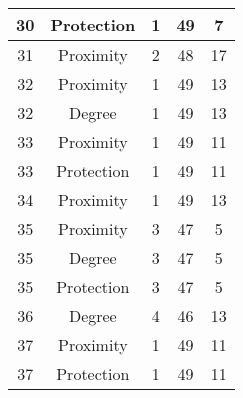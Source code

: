 \documentclass[results.tex]{subfiles}
\begin{document}
\begin{center}
\begin{tabular}{| c || c | c | c | c |}
            \hline
            30                      & Protection                   & 1                      & 49                      & 7                    \\
            \hline
            31                      & Proximity                    & 2                      & 48                      & 17                   \\
            \hline
            32                      & Proximity                    & 1                      & 49                      & 13                   \\
            \hline
            32                      & Degree                       & 1                      & 49                      & 13                   \\
            \hline
            33                      & Proximity                    & 1                      & 49                      & 11                   \\
            \hline
            33                      & Protection                   & 1                      & 49                      & 11                   \\
            \hline
            34                      & Proximity                    & 1                      & 49                      & 13                   \\
            \hline
            35                      & Proximity                    & 3                      & 47                      & 5                    \\
            \hline
            35                      & Degree                       & 3                      & 47                      & 5                    \\
            \hline
            35                      & Protection                   & 3                      & 47                      & 5                    \\
            \hline
            36                      & Degree                       & 4                      & 46                      & 13                   \\
            \hline
            37                      & Proximity                    & 1                      & 49                      & 11                   \\
            \hline
            37                      & Protection                   & 1                      & 49                      & 11                   \\

\end{tabular}
\end{center}
\end{document}
